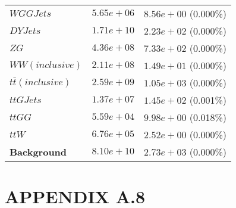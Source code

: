 \begin{table}
\begin{tabular}{ |l|c|c| }
                                 $WGGJets$ &  $5.65e+06$  &  $8.56e+00$ (0.000\%) \\
                                  $DYJets$ &  $1.71e+10$  &  $2.23e+02$ (0.000\%) \\
                                      $ZG$ &  $4.36e+08$  &  $7.33e+02$ (0.000\%) \\
                           $WW(inclusive)$ &  $2.11e+08$  &  $1.49e+01$ (0.000\%) \\
                    $t\bar{t} (inclusive)$ &  $2.59e+09$  &  $1.05e+03$ (0.000\%) \\
                                 $ttGJets$ &  $1.37e+07$  &  $1.45e+02$ (0.001\%) \\
                                    $ttGG$ &  $5.59e+04$  &  $9.98e+00$ (0.018\%) \\
                                     $ttW$ &  $6.76e+05$  &  $2.52e+00$ (0.000\%) \\
                       \textbf{Background} &  $8.10e+10$  &  $2.73e+03$ (0.000\%) \\
    \hline
\end{tabular}
\label{cutflow-doubletau}
\end{table}


\section*{APPENDIX A.8}

